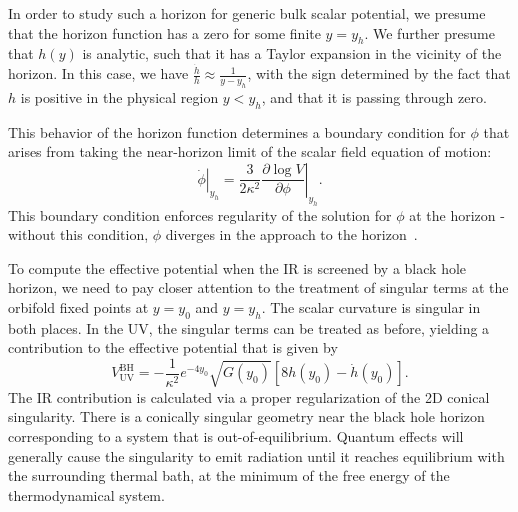\documentclass[12pt]{article}
\begin{document}
In order to study such a horizon for generic bulk scalar potential, we presume that the horizon function has a zero for some finite $y=y_h$.  We further presume that $h(y)$ is analytic, such that it has a Taylor expansion in the vicinity of the horizon.  In this case, we have $\frac{\dot{h}}{h} \approx \frac{1}{y-y_h}$, with the sign determined by the fact that $h$ is positive in the physical region $y < y_h$, and that it is passing through zero.

This behavior of the horizon function determines a boundary condition for $\phi$ that arises from taking the near-horizon limit of the scalar field equation of motion:
\begin{equation}
\left. \dot{\phi} \right|_{y_h} = \left. \frac{3}{2\kappa^2} \frac{\partial \log V}{\partial \phi} \right|_{y_h}.
\label{eq:horbc}
\end{equation}
This boundary condition enforces regularity of the solution for $\phi$ at the horizon - without this condition, $\phi$ diverges in the approach to the horizon~\cite{Gubser:2001vj}.

To compute the effective potential when the IR is screened by a black hole horizon, we need to pay closer attention to the treatment of singular terms at the orbifold fixed points at $y=y_0$ and $y=y_h$.  The scalar curvature is singular in both places.  In the UV, the singular terms can be treated as before, yielding a contribution to the effective potential that is given by 
\begin{equation}
V_\text{UV}^{\text{BH}} = -\frac{1}{\kappa^2}  e^{-4 y_0} \sqrt{G (y_0)} \left[ 8 h(y_0) - \dot{h} (y_0) \right].
\end{equation}
The IR contribution is calculated via a proper regularization of the 2D conical singularity.  There is a conically singular geometry near the black hole horizon corresponding to a system that is out-of-equilibrium.  Quantum effects will generally cause the singularity to emit radiation until it reaches equilibrium with the surrounding thermal bath, at the minimum of the free energy of the thermodynamical system.
\end{document}
